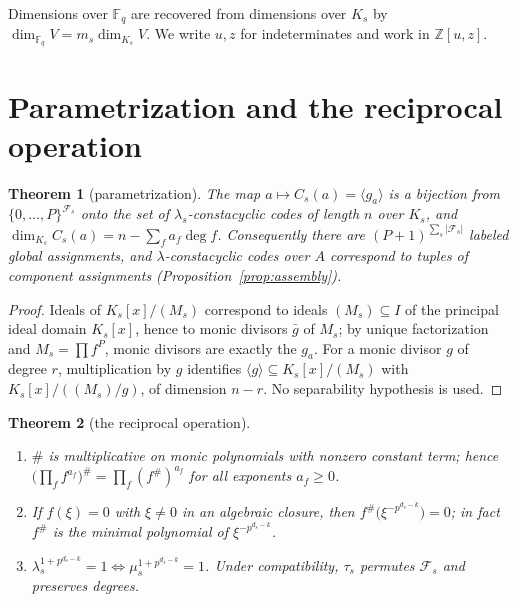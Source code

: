 \documentclass[11pt]{article}
\newtheorem{theorem}{Theorem}[section]
\theoremstyle{definition}
\theoremstyle{remark}
\newcommand{\Fq}{\mathbb{F}_q}
\newcommand{\Z}{\mathbb{Z}}
\begin{document}
Dimensions over \(\Fq\) are recovered from dimensions over \(K_s\) by
\(\dim_{\Fq} V = m_s \dim_{K_s} V\). We write \(u, z\) for indeterminates
and work in \(\Z[u,z]\).

\section{Parametrization and the reciprocal operation}\label{sec:param}

\begin{theorem}[parametrization]\label{thm:T1}
The map \(a \mapsto C_s(a) = \langle g_a \rangle\) is a bijection from
\(\{0,\dots,P\}^{\mathcal{F}_s}\) onto the set of \(\lambda_s\)-constacyclic
codes of length \(n\) over \(K_s\), and
\(\dim_{K_s} C_s(a) = n - \sum_{f} a_f \deg f\).
Consequently there are \((P+1)^{\sum_s |\mathcal{F}_s|}\) labeled global
assignments, and \(\lambda\)-constacyclic codes over \(A\) correspond to tuples
of component assignments (Proposition~\ref{prop:assembly}).
\end{theorem}

\begin{proof}
Ideals of \(K_s[x]/(M_s)\) correspond to ideals \((M_s) \subseteq I\) of
the principal ideal domain \(K_s[x]\), hence to monic divisors
\(\bar g\) of \(M_s\); by unique factorization and \(M_s =
\prod f^P\), monic divisors are exactly the \(g_a\). For a monic divisor
\(g\) of degree \(r\), multiplication by \(g\) identifies
\(\langle g \rangle \subseteq K_s[x]/(M_s)\) with
\(K_s[x]/((M_s)/g)\), of dimension \(n - r\). No separability hypothesis
is used.
\end{proof}

\begin{theorem}[the reciprocal operation]\label{thm:T2}
\begin{enumerate}
\item[(i)] \(\#\) is multiplicative on monic polynomials with nonzero
constant term; hence
\(\big(\prod_f f^{a_f}\big)^{\#} = \prod_f (f^{\#})^{a_f}\) for all
exponents \(a_f \ge 0\).
\item[(ii)] If \(f(\xi) = 0\) with \(\xi \ne 0\) in an algebraic
closure, then \(f^{\#}\big(\xi^{-p^{d_s-k}}\big) = 0\); in fact
\(f^{\#}\) is the minimal polynomial of \(\xi^{-p^{d_s-k}}\).
\item[(iii)] \(\lambda_s^{1+p^{d_s-k}} = 1 \iff
\mu_s^{1+p^{d_s-k}} = 1\). Under compatibility, \(\tau_s\) permutes
\(\mathcal{F}_s\) and preserves degrees.
\end{enumerate}
\end{theorem}
\end{document}

